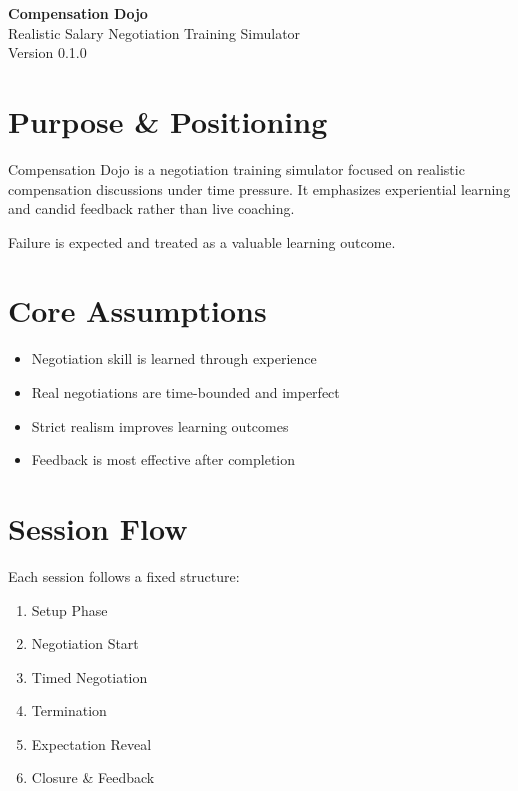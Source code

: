 \documentclass[11pt]{article}
\begin{document}
\begin{center}
{\LARGE \textbf{Compensation Dojo}}\\
\vspace{0.2cm}
{\large Realistic Salary Negotiation Training Simulator}\\
\vspace{0.2cm}
Version 0.1.0
\end{center}

\vspace{0.5cm}

\section{Purpose \& Positioning}

Compensation Dojo is a negotiation training simulator focused on realistic compensation discussions under time pressure. It emphasizes experiential learning and candid feedback rather than live coaching.

Failure is expected and treated as a valuable learning outcome.

\section{Core Assumptions}

\begin{itemize}
\item Negotiation skill is learned through experience
\item Real negotiations are time-bounded and imperfect
\item Strict realism improves learning outcomes
\item Feedback is most effective after completion
\end{itemize}

\section{Session Flow}

Each session follows a fixed structure:
\begin{enumerate}
\item Setup Phase
\item Negotiation Start
\item Timed Negotiation
\item Termination
\item Expectation Reveal
\item Closure \& Feedback
\end{enumerate}
\end{document}
